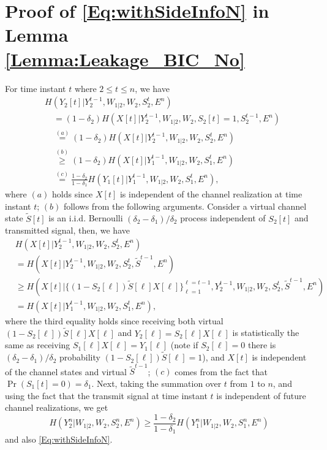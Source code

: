 \documentclass[journal,12pt,draftcls,onecolumn]{IEEEtran}
\newcommand{\lp}{\left(}
\newcommand{\rp}{\right)}
\begin{document}
\appendices

\section{Proof of \eqref{Eq:withSideInfoN} in Lemma \ref{Lemma:Leakage_BIC_No}} \label{AppEqwithSideInfoN}
For time instant $t$ where $2 \leq t \leq n$, we have
\begin{align}
& H\left( Y_2[t] | Y_2^{t-1}, W_{1|2}, W_2, S_2^t, E^n \right) \\
& \quad = \lp 1 - \delta_2 \rp H\left( X[t] | Y_2^{t-1}, W_{1|2}, W_2, S_{2}[t] = 1,  S_2^{t-1}, E^n \right) \nonumber \\
& \quad \overset{(a)}= \lp 1 - \delta_2 \rp H\left( X[t] | Y_2^{t-1}, W_{1|2}, W_2, S_2^t, E^n \right) \nonumber \\
& \quad \overset{(b)}\geq \lp 1 - \delta_2 \rp H\left( X[t] | Y_1^{t-1}, W_{1|2}, W_2, S_1^t, E^n \right) \nonumber \\
& \quad \overset{(c)}= \frac{1 - \delta_2}{1 - \delta_1} H\left( Y_1[t] | Y_1^{t-1}, W_{1|2}, W_2, S_1^t, E^n \right),
\end{align}
where $(a)$ holds since $X[t]$ is independent of the channel realization at time instant $t$; $(b)$ follows from the following arguments. Consider a virtual channel state $\tilde{S}[t]$ is an i.i.d. Bernoulli $(\delta_2-\delta_1)/\delta_2$ process independent of $S_2[t]$ and transmitted signal, then, we have
\begin{align}
& H\left( X[t] | Y_2^{t-1}, W_{1|2}, W_2, S_2^t , E^n \right) \nonumber \\
&= H\left( X[t] | Y_2^{t-1}, W_{1|2}, W_2, S_2^t , \tilde{S}^{t-1} , E^n \right) \nonumber \\
&\geq  H\left( X[t] | \{ (1-S_2[\ell])\tilde{S}[\ell]X[\ell] \}_{\ell= 1}^{\ell = t-1}, Y_2^{t-1}, W_{1|2}, W_2, S_2^t , \tilde{S}^{t-1} , E^n \right) \nonumber \\
&= H\left( X[t] | Y_1^{t-1}, W_{1|2}, W_2, S_1^t , E^n \right),
\end{align}
where the third equality holds since receiving both virtual $(1-S_2[\ell])\tilde{S}[\ell]X[\ell]$ and $Y_2[\ell]=S_2[\ell]X[\ell]$ is statistically the same as receiving $S_1[\ell]X[\ell]=Y_1[\ell]$ (note if $S_2[\ell]=0$ there is $(\delta_2-\delta_1)/\delta_2$ probability $(1-S_2[\ell])\tilde{S}[\ell]=1$), and $X[t]$ is independent of the channel states and virtual $\tilde{S}^{t-1}$; $(c)$ comes from the fact that $\Pr\lp S_1[t]  = 0 \rp = \delta_1$. Next, taking the summation over $t$ from $1$ to $n$, and using the fact that the transmit signal at time instant $t$ is independent of future channel realizations, we get
\[
H\left( Y_2^n | W_{1|2}, W_2, S^n_2, E^n \right)  \geq \frac{1-\delta_2}{1-\delta_1} H\left( Y_1^n | W_{1|2}, W_2, S^n_1, E^n \right)
\]
and also \eqref{Eq:withSideInfoN}.
\end{document}
